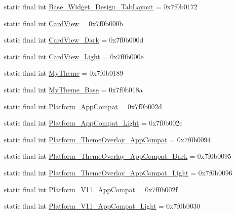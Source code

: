 \begin{CompactItemize}
\item 
static final int \hyperlink{classandroid_1_1support_1_1v7_1_1palette_1_1_r_1_1style_c31c53c95c4e2c01577c38a7809bfe07}{Base\_\-Widget\_\-Design\_\-TabLayout} = 0x7f0b0172
\item 
static final int \hyperlink{classandroid_1_1support_1_1v7_1_1palette_1_1_r_1_1style_9f2d55aac9622e8b6e1a0cc92e86f84f}{CardView} = 0x7f0b000b
\item 
static final int \hyperlink{classandroid_1_1support_1_1v7_1_1palette_1_1_r_1_1style_b768427778aa5e43ebe4ecd454e28749}{CardView\_\-Dark} = 0x7f0b000d
\item 
static final int \hyperlink{classandroid_1_1support_1_1v7_1_1palette_1_1_r_1_1style_7c5f766439d6fd251975f0f13e59d15e}{CardView\_\-Light} = 0x7f0b000e
\item 
static final int \hyperlink{classandroid_1_1support_1_1v7_1_1palette_1_1_r_1_1style_1fdc6314cd5b92f344e3bfa5df14e63b}{MyTheme} = 0x7f0b0189
\item 
static final int \hyperlink{classandroid_1_1support_1_1v7_1_1palette_1_1_r_1_1style_f5c04eead4f466685d4258779237cc7d}{MyTheme\_\-Base} = 0x7f0b018a
\item 
static final int \hyperlink{classandroid_1_1support_1_1v7_1_1palette_1_1_r_1_1style_b688cbdd74bd73fc80360b984a9e3ff1}{Platform\_\-AppCompat} = 0x7f0b002d
\item 
static final int \hyperlink{classandroid_1_1support_1_1v7_1_1palette_1_1_r_1_1style_f5328ad3edbc746c1e2e172b1766bb95}{Platform\_\-AppCompat\_\-Light} = 0x7f0b002e
\item 
static final int \hyperlink{classandroid_1_1support_1_1v7_1_1palette_1_1_r_1_1style_0560712cbf4880cbc8f64f6fa1989b61}{Platform\_\-ThemeOverlay\_\-AppCompat} = 0x7f0b0094
\item 
static final int \hyperlink{classandroid_1_1support_1_1v7_1_1palette_1_1_r_1_1style_eaa74d18d08c94eb12096a19195cb656}{Platform\_\-ThemeOverlay\_\-AppCompat\_\-Dark} = 0x7f0b0095
\item 
static final int \hyperlink{classandroid_1_1support_1_1v7_1_1palette_1_1_r_1_1style_fc07b624694f0bd3b0fb5b631ea61bc2}{Platform\_\-ThemeOverlay\_\-AppCompat\_\-Light} = 0x7f0b0096
\item 
static final int \hyperlink{classandroid_1_1support_1_1v7_1_1palette_1_1_r_1_1style_262c214b77628f65f41081bc20aa814c}{Platform\_\-V11\_\-AppCompat} = 0x7f0b002f
\item 
static final int \hyperlink{classandroid_1_1support_1_1v7_1_1palette_1_1_r_1_1style_7ca028ea59ea632e6b0a858d0b9cb1bc}{Platform\_\-V11\_\-AppCompat\_\-Light} = 0x7f0b0030

\end{CompactItemize}

